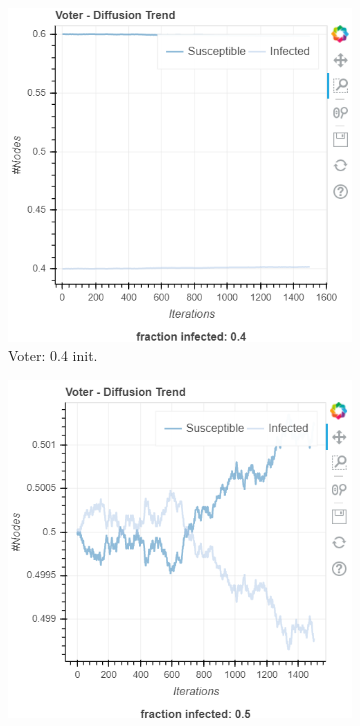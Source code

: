\documentclass[sigchi]{acmart}
\begin{document}
\begin{figure}[ht]
\begin{subfigure}{.20\textwidth}
  \centering
  \includegraphics[width=\linewidth]{report/img/voter1.png}  
  \caption{Voter: 0.4 init.}
  \label{fig:sub-first}
\end{subfigure}
\hfill
\begin{subfigure}{.20\textwidth}
  \centering
  \includegraphics[width=\linewidth]{report/img/voter2.png}  

\end{subfigure}
\end{figure}
\end{document}
